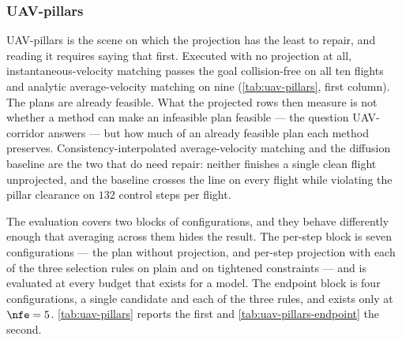%
%

\subsubsection{UAV-pillars}\label{sec:res:uav:pillars}

UAV-pillars is the scene on which the projection has the least to repair, and reading it requires saying
that first. Executed with no projection at all, instantaneous-velocity matching passes the goal
collision-free on all ten flights and analytic average-velocity matching on nine
(\autoref{tab:uav-pillars}, first column). The plans are already feasible. What the projected rows then
measure is not whether a method can make an infeasible plan feasible --- the question UAV-corridor
answers --- but how much of an already feasible plan each method preserves. Consistency-interpolated
average-velocity matching and the diffusion baseline are the two that do need repair: neither finishes a
single clean flight unprojected, and the baseline crosses the line on every flight while violating the
pillar clearance on $132$ control steps per flight.

The evaluation covers two blocks of configurations, and they behave differently enough that averaging
across them hides the result. The per-step block is seven configurations --- the plan without projection,
and per-step projection with each of the three selection rules on plain and on tightened constraints ---
and is evaluated at every budget that exists for a model. The endpoint block is four configurations, a
single candidate and each of the three rules, and exists only at $\nfe=5$.
\autoref{tab:uav-pillars} reports the first and \autoref{tab:uav-pillars-endpoint} the second.

